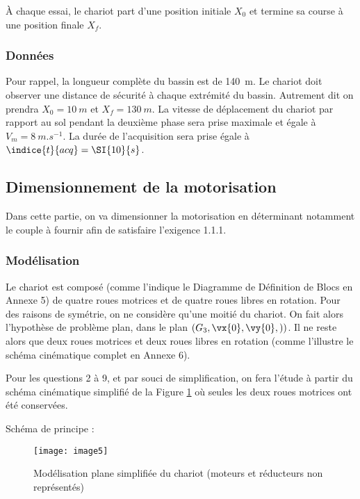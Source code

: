À chaque essai, le chariot part d'une position initiale $X_0$ et termine sa course à une position finale $X_f$.
\subsubsection*{Données}
Pour rappel, la longueur complète du bassin est de \SI{140}{m}. Le chariot doit observer une distance de sécurité à chaque extrémité du bassin. Autrement dit on prendra $X_0=\SI{10}{m}$ et $X_f=\SI{130}{m}$.
La vitesse de déplacement du chariot par rapport au sol pendant la deuxième phase sera prise maximale et égale à $V_m=\SI{8}{m.s^{-1}}$. La durée de l'acquisition sera prise égale à $\indice{t}{acq}=\SI{10}{s}$.



\subsection{Dimensionnement de la motorisation}
Dans cette partie, on va dimensionner la motorisation en déterminant notamment le couple à fournir afin de satisfaire l’exigence 1.1.1.
\subsubsection{Modélisation}
Le chariot est composé (comme l'indique le Diagramme de Définition de Blocs en Annexe 5) de quatre roues motrices et de quatre roues libres en rotation. Pour des raisons de symétrie, on ne considère qu'une moitié du chariot. On fait alors l’hypothèse de problème plan, dans le plan $\left(G_3,\vx{0},\vy{0}, )\right)$. Il ne reste alors que deux roues motrices et deux roues libres en rotation (comme l’illustre le schéma cinématique complet en Annexe 6).

Pour les questions 2 à 9, et par souci de simplification, on fera l'étude à partir du schéma cinématique simplifié de la Figure \ref{fig:CCMP:2021:05} où seules les deux roues motrices ont été conservées.

Schéma de principe : 
\begin{figure}[!h]
\centering
\texttt{[image: image5]}
\caption{ \label{fig:CCMP:2021:05} Modélisation plane simplifiée du chariot (moteurs et réducteurs non représentés)}
\end{figure} 

